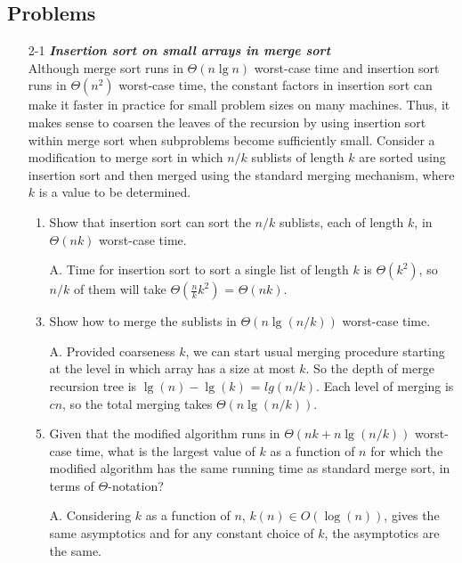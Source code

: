 \documentclass[fontsize=12pt,paper=a4]{book}
\begin{document}
\subsection*{Problems}
\begin{enumerate}
 \item[2-1]
       \textbf{\textit{Insertion sort on small arrays in merge sort}}\\
       Although merge sort runs in $\Theta(n \lg n)$ worst-case time and insertion sort runs in $\Theta(n^2)$ worst-case time, the constant factors in insertion sort can make it faster in practice for small problem sizes on many machines. Thus, it makes sense to coarsen the leaves of the recursion by using insertion sort within merge sort when subproblems become sufficiently small. Consider a modification to merge sort in which $n/k$ sublists of length $k$ are sorted using insertion sort and then merged using the standard merging mechanism, where $k$ is a value to be determined.
       \begin{enumerate}
        \item Show that insertion sort can sort the $n/k$ sublists, each of length $k$, in $\Theta(nk)$ worst-case time.
        \item[A.]
              Time for insertion sort to sort a single list of length $k$ is $\Theta(k^2)$, so $n/k$ of them will take $\Theta(\frac{n}{k} k^2)$ = $\Theta(nk)$.
              
        \item Show how to merge the sublists in $\Theta(n \lg(n/k))$ worst-case time.
        \item[A.]
              Provided coarseness $k$, we can start usual merging procedure starting at the level in which array has a size at most $k$. So the depth of merge recursion tree is $\lg(n)-\lg(k)$ = $lg(n/k)$. Each level of merging is $cn$, so the total merging takes $\Theta(n \lg(n/k))$.
              
        \item Given that the modified algorithm runs in $\Theta(nk + n \lg(n/k))$ worst-case time, what is the largest value of $k$ as a function of $n$ for which the modified algorithm has the same running time as standard merge sort, in terms of $\Theta$-notation?
        \item[A.]
              Considering $k$ as a function of $n$, $k(n)\in O(\log(n))$, gives the same asymptotics and for any constant choice of $k$, the asymptotics are the same.
              

\end{enumerate}
\end{enumerate}
\end{document}
